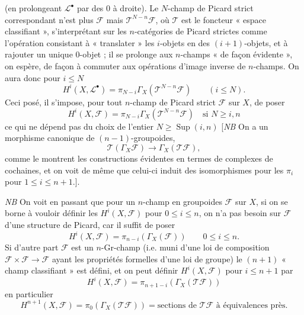 \documentclass[11pt,a4paper]{article}
\begin{document}
(en prolongeant $\mathcal{L}^\bullet$ par des $0$ à droite). Le $N$-champ de Picard strict correspondant n'est plus $\mathcal{F}$ mais $\mathcal{T}^{N-n}\mathcal{F}$, où $\mathcal{T}$ est le foncteur « espace classifiant », s'interprétant sur les $n$-catégories de Picard strictes comme l'opération consistant à « translater » les $i$-objets en des $(i+1)$-objets, et à rajouter un unique 0-objet ; il se prolonge aux $n$-champs  « de façon évidente », on espère, de façon à commuter aux opérations d'image inverse de $n$-champs. On aura donc pour $i \leqslant N$
\[
H^i(X, \mathcal{L}^\bullet) = \pi_{N-i}\Gamma_X(\mathcal{T}^{N-n}\mathcal{F}) \qquad (i \leqslant N).
\]
Ceci posé, il s'impose, pour tout $n$-champ de Picard strict $\mathcal{F}$ sur $X$, de poser
\[
\boxed{H^i(X, \mathcal{F}) = \pi_{N-i}\Gamma_X(\mathcal{T}^{N-n}\mathcal{F}) \quad \text{si } N \geqslant i, n}
\]
ce qui ne dépend pas du choix de l'entier $N \geqslant \operatorname{Sup}(i, n)$ [\emph{NB} On a un morphisme canonique de $(n-1)$-groupoides,
\[
\mathcal{T}(\Gamma_X\mathcal{F}) \to \Gamma_X(\mathcal{T}\mathcal{F}),
\]
comme le montrent les constructions évidentes en termes de complexes de cochaines, et on voit de même que celui-ci induit des isomorphismes pour les $\pi_i$ pour $1 \leqslant i \leqslant n+1$.].

\emph{NB} On voit en passant que pour un $n$-champ en groupoides $\mathcal{F}$ sur $X$, si on se borne à vouloir définir les $H^i(X, \mathcal{F})$ pour $0 \leqslant i \leqslant n$, on n'a pas besoin sur $\mathcal{F}$ d'une structure de Picard, car il suffit de poser
\[
H^i(X, \mathcal{F}) = \pi_{n-i}(\Gamma_X(\mathcal{F})) \qquad 0 \leqslant i \leqslant n.
\]
Si d'autre part $\mathcal{F}$ est un $n$-Gr-champ (i.e. muni d'une loi de composition $\mathcal{F} \times \mathcal{F} \to \mathcal{F}$ ayant les propriétés formelles d'une loi de groupe) le $(n+1)$ « champ classifiant » est défini, et on peut définir $H^i(X, \mathcal{F})$ pour $i \leqslant n+1$ par
\[
H^i(X, \mathcal{F}) = \pi_{n+1-i}(\Gamma_X(\mathcal{T}\mathcal{F}))
\]
en particulier
\[
H^{n+1}(X, \mathcal{F}) = \pi_0(\Gamma_X(\mathcal{T}\mathcal{F})) = \text{sections de } \mathcal{T}\mathcal{F} \text{ à équivalences près}.
\]
\end{document}
